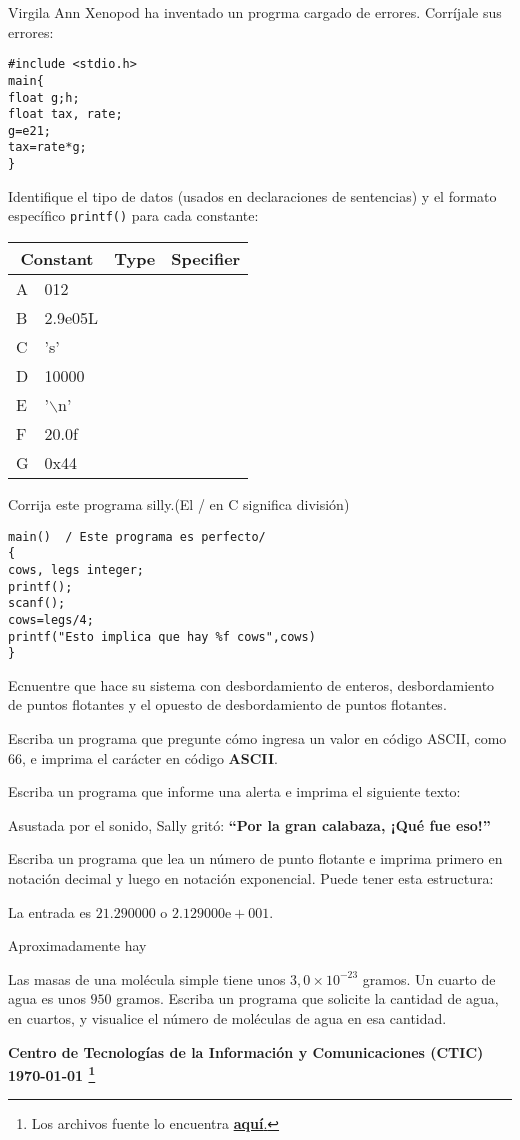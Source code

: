 \documentclass[spanish,addpoints,answers,a4paper]{exam}
\newcommand{\unmarkedfntext}[1]{%
	\begingroup
	\renewcommand\thefootnote{}\footnote{#1}%
	\addtocounter{footnote}{-1}%
	\endgroup
}
\begin{document}
\begin{questions}
\question Virgila Ann Xenopod ha inventado un progrma cargado de errores. Corríjale sus errores:

\begin{verbatim}
#include <stdio.h>
main{
float g;h;
float tax, rate;
g=e21;
tax=rate*g;
}
\end{verbatim}

\question Identifique el tipo de datos (usados en declaraciones de sentencias) y el formato específico \texttt{printf()} para cada constante:

\begin{table}[H]
	\centering
\begin{tabular}{|l|l|c|c|}
	\hline
	\multicolumn{2}{|c|}{\bfseries Constant} & \textbf{Type} & \textbf{Specifier}	\\
	\hline
	A	&	012 	& 	& 	\\
	\hline
	B 	&	2.9e05L	&	&	\\
	\hline
	C	&	's'		& 	&	\\
	\hline
	D	&	10000 	& 	&	\\
	\hline
	E	&	'$\backslash$n' &	&	\\
	\hline
	F	&	20.0f	&	&	\\
	\hline
	G	&	0x44	&	&	\\
	\hline
\end{tabular}
\end{table}

\question Corrija este programa silly.\qquad(El / en C significa división)

\begin{verbatim}
main()	/ Este programa es perfecto/
{
cows, legs integer;
printf();
scanf();
cows=legs/4;
printf("Esto implica que hay %f cows",cows)
}
\end{verbatim}

\question Ecnuentre que hace su sistema con desbordamiento de enteros, desbordamiento de puntos flotantes y el opuesto de desbordamiento de puntos flotantes.

\question Escriba un programa que pregunte cómo ingresa un valor en código ASCII, como $66$, e imprima el carácter en código \textbf{ASCII}.

\question Escriba un programa que informe una alerta e imprima el siguiente texto:

Asustada por el sonido, Sally gritó: \textbf{``Por la gran calabaza, ¡Qué fue eso!''}

\question Escriba un programa que lea un número de punto flotante e imprima primero en notación decimal y luego en notación exponencial. Puede tener esta estructura:

La entrada es $21.290000$ o $2.129000\text{e}+001$.

\question Aproximadamente hay 

\question Las masas de una molécula simple tiene unos $3,0\times10^{-23}$ gramos. Un cuarto de agua es unos $950$ gramos. Escriba un programa que solicite la cantidad de agua, en cuartos, y visualice el número de moléculas de agua en esa cantidad. 
\end{questions}
\begin{flushright}\bfseries
Centro de Tecnologías de la Información y Comunicaciones (CTIC)\\[2mm]
\today\unmarkedfntext{Los archivos fuente lo encuentra  \href{https://github.com/carlosal1015/C-Programming}{\textbf{aquí}.}}
\end{flushright}
\end{document}
